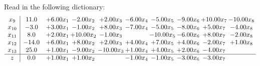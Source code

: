 \documentclass[9pt]{article}
\begin{document}
Read in the following dictionary:
\[\begin{array}{c| c c@{\hskip 2pt} c@{\hskip 2pt} c@{\hskip 2pt} c@{\hskip 2pt} c@{\hskip 2pt} c@{\hskip 2pt} c@{\hskip 2pt} c@{\hskip 2pt} }
 x_{9}   &  11.0 & +  6.00 x_{1} & -2.00 x_{2} & +  2.00 x_{3} & -6.00 x_{4} & -5.00 x_{5} & -9.00 x_{6} & + 10.00 x_{7} & -10.00 x_{8}\\
 x_{10}   &  -3.0 & +  3.00 x_{1} & -1.00 x_{2} & +  8.00 x_{3} & -7.00 x_{4} & -5.00 x_{5} & -8.00 x_{6} & +  5.00 x_{7} & -4.00 x_{8}\\
 x_{11}   &  8.0 & +  2.00 x_{1} & + 10.00 x_{2} & -1.00 x_{3} &   & -10.00 x_{5} & -6.00 x_{6} & +  8.00 x_{7} & -2.00 x_{8}\\
 x_{12}   &  -14.0 & +  6.00 x_{1} & +  8.00 x_{2} & +  2.00 x_{3} & +  4.00 x_{4} & +  7.00 x_{5} & +  4.00 x_{6} & -2.00 x_{7} & +  1.00 x_{8}\\
 x_{13}   &  25.0 & +  1.00 x_{1} & -9.00 x_{2} & -10.00 x_{3} & +  1.00 x_{4} & +  4.00 x_{5} & +  2.00 x_{6} & -4.00 x_{7} &   \\
\hline
z    &  0.0 & +  1.00 x_{1} & +  1.00 x_{2} &   & -1.00 x_{4} & -1.00 x_{5} & -3.00 x_{6} & -3.00 x_{7} &   \\
\end{array}\]
\end{document}
